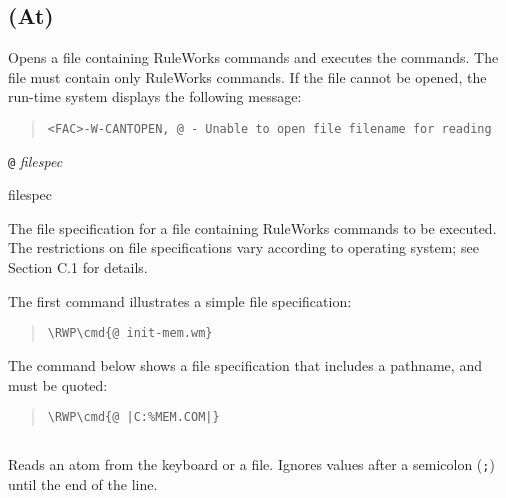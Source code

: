\subsection{\co@ (At)}

Opens a file containing RuleWorks commands and executes the
commands. The file must contain only RuleWorks commands. If the file
cannot be opened, the run-time system displays the following message:

\begin{quote}
\begin{verbatim}
<FAC>-W-CANTOPEN, @ - Unable to open file filename for reading
\end{verbatim}
\end{quote}

\Format

\verb|@| \it{filespec}

\begin{arguments}
\item[filespec]

  The file specification for a file containing RuleWorks commands to
  be executed. The restrictions on file specifications vary according
  to operating system; see Section C.1 for details.
\end{arguments}

\Example

The first command illustrates a simple file specification:

\begin{quote}
\begin{Verbatim}[commandchars=\\\{\}]
\RWP\cmd{@ init-mem.wm}
\end{Verbatim}
\end{quote}

The command below shows a file specification that includes a pathname,
and must be quoted:

\begin{quote}
\begin{Verbatim}[commandchars=\\\{\}]
\RWP\cmd{@ |C:%MEM.COM|}
\end{Verbatim}
\end{quote}

\subsection{}

Reads an atom from the keyboard or a file. Ignores values after a
semicolon (\verb|;|) until the end of the line.

